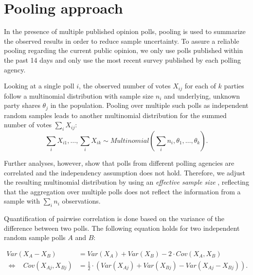\documentclass[smallcondensed]{svjour3}     %
\begin{document}
\section{Pooling approach} \label{sec:pooling}
In the presence of multiple published opinion polls, pooling is used to
summarize the observed results in order to reduce sample uncertainty.
To assure a reliable pooling regarding the current public opinion,
we only use polls published within the past 14 days and only use the
most recent survey published by each polling agency.

Looking at a single poll $i$, the observed number of votes $X_{ij}$ for each of $k$ parties follow a multinomial distribution with sample size $n_i$ and underlying, unknown party shares $\theta_j$ in the population.
Pooling over multiple such polls as independent random samples leads to another multinomial distribution for the summed number of votes $\sum_i X_{ij}$:
\begin{equation}
\sum\limits_i X_{i1},\ldots, \sum\limits_i X_{ik} \sim Multinomial \left( \sum\limits_i n_i,\theta_1,\ldots,\theta_k \right).
\end{equation}

Further analyses, however, show that polls from different
polling agencies are correlated
and the independency assumption does not hold.
Therefore, we adjust the resulting multinomial
distribution by using an \textit{effective sample size} \citep{hanley_2003},
reflecting that the aggregation over multiple polls does not reflect the 
information from a sample with $\sum_i n_i$ observations.

Quantification of pairwise correlation is done based on the variance of the
difference between two polls. The following equation holds for two independent
random sample polls $A$ and $B$:

\begin{equation}
\begin{aligned}
Var(X_A - X_B) &= Var(X_A) + Var(X_B) - 2 \cdot Cov(X_A, X_B) \\
\Leftrightarrow \ \ \ \ Cov(X_{Aj}, X_{Bj}) &= \frac{1}{2} \cdot \left(Var(X_{Aj}) + Var(X_{Bj}) - Var(X_{Aj} - X_{Bj}) \right).
\end{aligned}
\end{equation}
\end{document}
